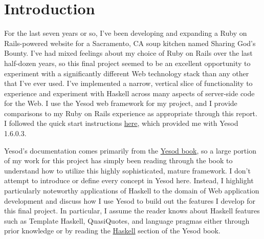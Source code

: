 \section{Introduction}

For the last seven years or so, I've been developing and expanding a Ruby on Rails-powered website for a Sacramento, CA soup kitchen named Sharing God's Bounty. I've had mixed feelings about my choice of Ruby on Rails over the last half-dozen years, so this final project seemed to be an excellent opportunity to experiment with a significantly different Web technology stack than any other that I've ever used. I've implemented a narrow, vertical slice of functionality to experience and experiment with Haskell across many aspects of server-side code for the Web. I use the Yesod web framework for my project, and I provide comparisons to my Ruby on Rails experience as appropriate through this report. I followed the quick start instructions \href{https://www.yesodweb.com/page/quickstart}{here}, which provided me with Yesod 1.6.0.3.

Yesod's documentation comes primarily from the \href{https://www.yesodweb.com/book}{Yesod book}, so a large portion of my work for this project has simply been reading through the book to understand how to utilize this highly sophisticated, mature framework. I don't attempt to introduce or define every concept in Yesod here. Instead, I highlight particularly noteworthy applications of Haskell to the domain of Web application development and discuss how I use Yesod to build out the features I develop for this final project. In particular, I assume the reader knows about Haskell features such as Template Haskell, QuasiQuotes, and language pragmas either through prior knowledge or by reading the \href{https://www.yesodweb.com/book/haskell}{Haskell} section of the Yesod book.

